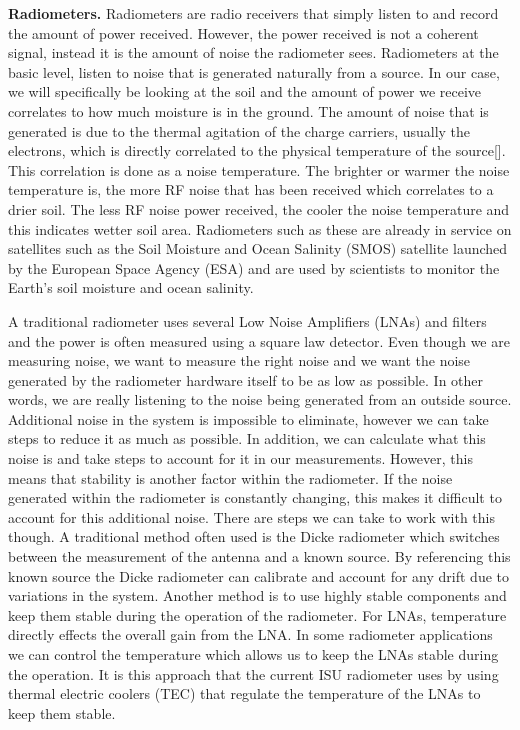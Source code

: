 \textbf{Radiometers.}  Radiometers are radio receivers that simply listen to and record the amount of power received.  However, the power received is not a coherent signal, instead it is the amount of noise the radiometer sees.  Radiometers at the basic level, listen to noise that is generated naturally from a source.  In our case, we will specifically be looking at the soil and the amount of power we receive correlates to how much moisture is in the ground.  The amount of noise that is generated is due to the thermal agitation of the charge carriers, usually the electrons, which is directly correlated to the physical temperature of the source[\cite{Nyquist1928thermal}].  This correlation is done as a noise temperature.  The brighter or warmer the noise temperature is, the more RF noise that has been received which correlates to a drier soil.  The less RF noise power received, the cooler the noise temperature and this indicates wetter soil area. Radiometers such as these are already in service on satellites such as the Soil Moisture and Ocean Salinity (SMOS) satellite launched by the European Space Agency (ESA) and are used by scientists to monitor the Earth's soil moisture and ocean salinity.  

A traditional radiometer uses several Low Noise Amplifiers (LNAs) and filters and the power is often measured using a square law detector.  Even though we are measuring noise, we want to measure the right noise and we want the noise generated by the radiometer hardware itself to be as low as possible.  In other words, we are really listening to the noise being generated from an outside source.  Additional noise in the system is impossible to eliminate, however we can take steps to reduce it as much as possible.  In addition, we can calculate what this noise is and take steps to account for it in our measurements.  However, this means that stability is another factor within the radiometer.  If the noise generated within the radiometer is constantly changing, this makes it difficult to account for this additional noise.  There are steps we can take to work with this though.  A traditional method often used is the Dicke radiometer which switches between the measurement of the antenna and a known source.  By referencing this known source the Dicke radiometer can calibrate and account for any drift due to variations in the system.  Another method is to use highly stable components and keep them stable during the operation of the radiometer.  For LNAs, temperature directly effects the overall gain from the LNA.  In some radiometer applications we can control the temperature which allows us to keep the LNAs stable during the operation.  It is this approach that the current ISU radiometer uses by using thermal electric coolers (TEC) that  regulate the temperature of the LNAs to keep them stable.

